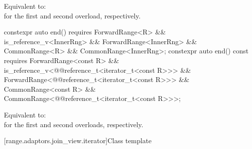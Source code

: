 \begin{itemdescr}
\pnum
\effects Equivalent to:  \\
for the first and second overload, respectively.
\end{itemdescr}

%
\begin{itemdecl}
constexpr auto end() requires ForwardRange<R> &&
  is_reference_v<InnerRng> && ForwardRange<InnerRng> &&
  CommonRange<R> && CommonRange<InnerRng>;
constexpr auto end() const requires ForwardRange<const R> &&
  is_reference_v<@@reference_t<iterator_t<const R>>> &&
  ForwardRange<@@reference_t<iterator_t<const R>>> &&
  CommonRange<const R> && CommonRange<@@reference_t<iterator_t<const R>>>;
\end{itemdecl}

\begin{itemdescr}
\pnum
\effects Equivalent to:
 \\
for the first and second overloads, respectively.
\end{itemdescr}

[range.adaptors.join_view.iterator]{Class template }

\pnum
{}

